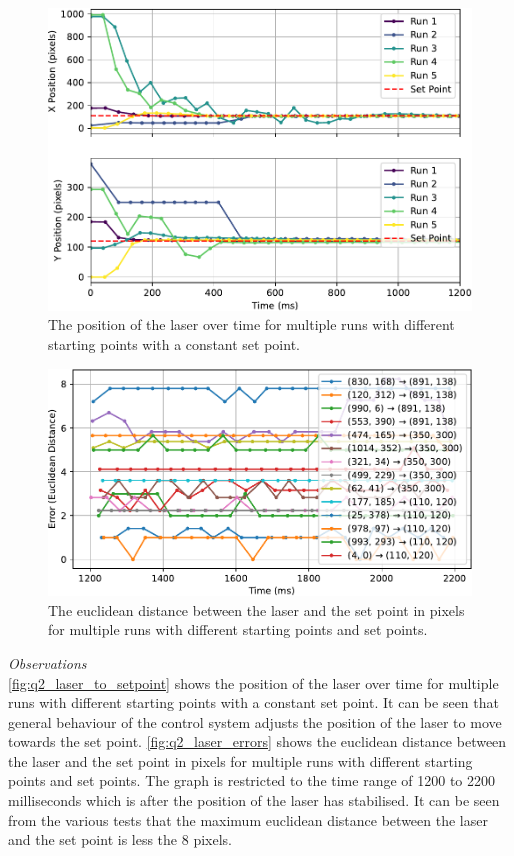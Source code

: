 \begin{figure}[!htb]
  \centering
  \includegraphics[width=\textwidth]{figures/results/q2.pdf}
  \caption{The position of the laser over time for multiple runs with different starting points with a constant set point.}
  \label{fig:q2_laser_to_setpoint}
\end{figure}

\begin{figure}[!htb]
  \centering
  \includegraphics[width=\textwidth]{figures/results/q2_errors.pdf}
  \caption{The euclidean distance between the laser and the set point in pixels for multiple runs with different starting points and set points.}
  \label{fig:q2_laser_errors}
\end{figure}

\textit{Observations}\\
\autoref{fig:q2_laser_to_setpoint} shows the position of the laser over time for multiple runs with different starting points with a constant set point. It can be seen that general behaviour of the control system adjusts the position of the laser to move towards the set point. \autoref{fig:q2_laser_errors} shows the euclidean distance between the laser and the set point in pixels for multiple runs with different starting points and set points. The graph is restricted to the time range of 1200 to 2200 milliseconds which is after the position of the laser has stabilised. It can be seen from the various tests that the maximum euclidean distance between the laser and the set point is less the 8 pixels.

